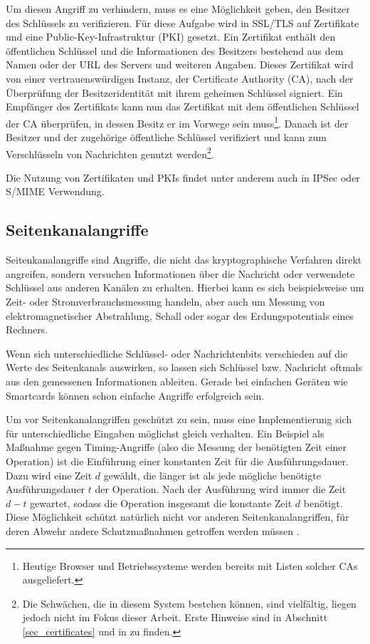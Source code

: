 Um diesen Angriff zu verhindern, muss es eine Möglichkeit geben, den Besitzer des Schlüssels zu verifizieren. Für diese Aufgabe wird in SSL/TLS auf Zertifikate und eine Public-Key-Infrastruktur (PKI) gesetzt. Ein Zertifikat enthält den öffentlichen Schlüssel und die Informationen des Besitzers bestehend aus dem Namen oder der URL des Servers und weiteren Angaben. Dieses Zertifikat wird von einer vertrauenswürdigen Instanz, der Certificate Authority (CA), nach der Überprüfung der Besitzeridentität mit ihrem geheimen Schlüssel signiert. Ein Empfänger des Zertifikats kann nun das Zertifikat mit dem öffentlichen Schlüssel der CA überprüfen, in dessen Besitz er im Vorwege sein muss\footnote{
	Heutige Browser und Betriebssysteme werden bereits mit Listen solcher CAs ausgeliefert.
}. Danach ist der Besitzer und der zugehörige öffentliche Schlüssel verifiziert und kann zum Verschlüsseln von Nachrichten genutzt werden\footnote{
	Die Schwächen, die in diesem System bestehen können, sind vielfältig, liegen jedoch nicht im Fokus dieser Arbeit. Erste Hinweise sind in Abschnitt \ref{sec_certificates} und in \cite{ferguson10} zu finden.
}. 

Die Nutzung von Zertifikaten und PKIs findet unter anderem auch in IPSec oder S/MIME Verwendung. 

\subsection{Seitenkanalangriffe}
Seitenkanalangriffe sind Angriffe, die nicht das kryptographische Verfahren direkt angreifen, sondern versuchen Informationen über die Nachricht oder verwendete Schlüssel aus anderen Kanälen zu erhalten. Hierbei kann es sich beispielsweise um Zeit- oder Stromverbrauchsmessung handeln, aber auch um Messung von elektromagnetischer Abstrahlung, Schall oder sogar des Erdungspotentials eines Rechners. 

Wenn sich unterschiedliche Schlüssel- oder Nachrichtenbits verschieden auf die Werte des Seitenkanals auswirken, so lassen sich Schlüssel bzw. Nachricht oftmals aus den gemessenen Informationen ableiten. Gerade bei einfachen Geräten wie Smartcards können schon einfache Angriffe erfolgreich sein.

Um vor Seitenkanalangriffen geschützt zu sein, muss eine Implementierung sich für unterschiedliche Eingaben möglichst gleich verhalten. Ein Beispiel als Maßnahme gegen Timing-Angriffe (also die Messung der benötigten Zeit einer Operation) ist die Einführung einer konstanten Zeit für die Ausführungsdauer. Dazu wird eine Zeit \(d\) gewählt, die länger ist als jede mögliche benötigte Ausführungsdauer \(t\) der Operation. Nach der Ausführung wird immer die Zeit \(d-t\) gewartet, sodass die Operation insgesamt die konstante Zeit \(d\) benötigt. Diese Möglichkeit schützt natürlich nicht vor anderen Seitenkanalangriffen, für deren Abwehr andere Schutzmaßnahmen getroffen werden müssen \cite{ferguson10}.


